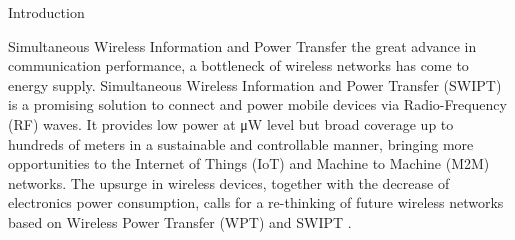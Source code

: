 \documentclass[journal]{IEEEtran}
\begin{document}
	\begin{section}{Introduction}
		\begin{subsection}{Simultaneous Wireless Information and Power Transfer}
			 the great advance in communication performance, a bottleneck of wireless networks has come to energy supply. Simultaneous Wireless Information and Power Transfer (SWIPT) is a promising solution to connect and power mobile devices via Radio-Frequency (RF) waves. It provides low power at \si{\uW} level but broad coverage up to hundreds of meters in a sustainable and controllable manner, bringing more opportunities to the Internet of Things (IoT) and Machine to Machine (M2M) networks. The upsurge in wireless devices, together with the decrease of electronics power consumption, calls for a re-thinking of future wireless networks based on Wireless Power Transfer (WPT) and SWIPT \cite{Clerckx2019}.


\end{subsection}
\end{section}
\end{document}
